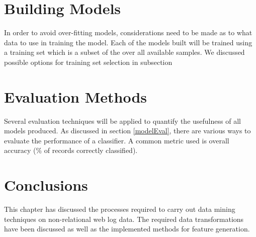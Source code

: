 \section{Building Models}
In order to avoid over-fitting models, considerations need to be made as to what data to use in training the model. Each of the models built will be trained using a training set which is a subset of the over all available samples. We discussed possible options for training set selection in subsection


\section{Evaluation Methods}
Several evaluation techniques will be applied to quantify the usefulness of all models produced. As discussed in section \ref{modelEval}, there are various ways to evaluate the performance of a classifier. A common metric used is overall accuracy (\% of records correctly classified). 


\section{Conclusions}\label{desConc}
This chapter has discussed the processes required to carry out data mining techniques on non-relational web log data. The required data transformations have been discussed as well as the implemented methods for feature generation.
